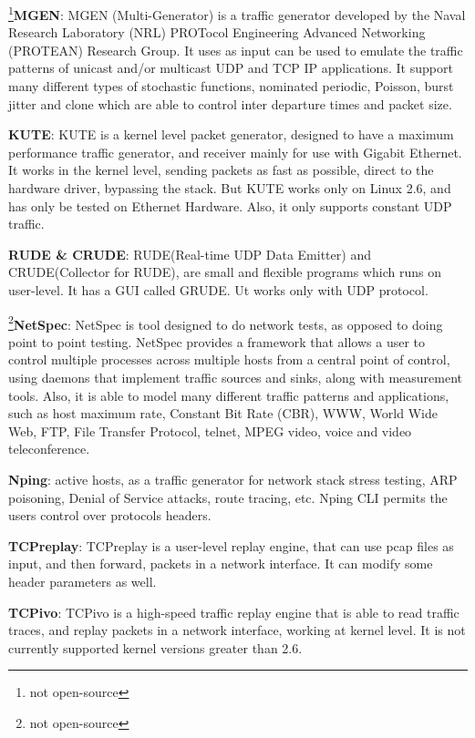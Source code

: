 \footnote{not open-source}\textbf{MGEN}\cite{web-mgen}: MGEN (Multi-Generator) is a traffic generator developed by the Naval Research Laboratory (NRL) PROTocol Engineering Advanced Networking (PROTEAN) Research Group. It uses as input can be used to emulate the traffic patterns of unicast and/or multicast UDP and TCP IP applications. It support many different types of stochastic functions, nominated periodic, Poisson, burst jitter and clone which are able to control inter departure times and packet size.


\textbf{KUTE}\cite{web-kute}: KUTE is a kernel level packet generator, designed to have a maximum performance traffic generator, and receiver mainly for use with Gigabit Ethernet. It works in the kernel level, sending packets as fast as possible, direct to the hardware driver, bypassing the stack. But KUTE works only on Linux 2.6, and has only be tested on Ethernet Hardware. Also, it only supports constant UDP traffic. 


\textbf{RUDE \& CRUDE}\cite{web-rude-crude}: RUDE(Real-time UDP Data Emitter) and CRUDE(Collector for RUDE), are small and flexible programs which runs on user-level. It has a GUI called GRUDE.  Ut works only with UDP protocol.


\footnote{not open-source}\textbf{NetSpec}\cite{web-netspec}: NetSpec is tool designed to do network tests, as opposed to doing point to point testing. NetSpec provides a framework that allows a user to control multiple processes across multiple hosts from a central point of control, using daemons that implement traffic sources and sinks, along with measurement tools. Also, it is able to model many different traffic patterns and applications, such as host maximum rate, Constant Bit Rate (CBR), WWW, World Wide Web, FTP, File Transfer Protocol, telnet, MPEG video, voice and video teleconference. 


\textbf{Nping}\cite{web-nping}: active hosts, as a traffic generator for network stack stress testing, ARP poisoning, Denial of Service attacks, route tracing, etc. Nping CLI permits the users control over protocols headers.


\textbf{TCPreplay}\cite{web-tcpreplay}: TCPreplay is a user-level replay engine, that can use pcap files as input, and then forward, packets in a network interface. It can modify some header parameters as well.


\textbf{TCPivo}\cite{tcpivo-paper}\cite{web-tcpivo}: TCPivo is a high-speed traffic replay engine that is able to read traffic traces, and replay packets in a network interface, working at kernel level. It is not currently supported kernel versions greater than 2.6.



